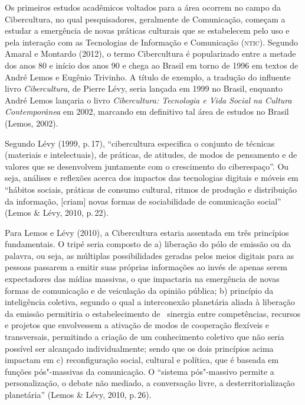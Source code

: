 Os primeiros estudos acadêmicos voltados para a área ocorrem no campo da
Cibercultura, no qual pesquisadores, geralmente de Comunicação,
começam a estudar a emergência de novas práticas culturais que se
estabelecem pelo uso e pela interação com as Tecnologias de Informação e
Comunicação (\textsc{ntic}). Segundo Amaral e Montardo (2012), o termo
Cibercultura é popularizado entre a metade dos anos 80 e início dos anos
90 e chega ao Brasil em torno de 1996 em textos de André Lemos e Eugênio
Trivinho. A título de exemplo, a tradução do influente livro
\emph{Cibercultura}, de Pierre Lévy, seria lançada em 1999 no Brasil,
enquanto André Lemos lançaria o livro \emph{Cibercultura: Tecnologia e
Vida Social na Cultura Contemporânea} em 2002, marcando em definitivo
tal área de estudos no Brasil (Lemos, 2002).

Segundo Lévy (1999, p.\,17), ``cibercultura especifica o conjunto de
técnicas (materiais e intelectuais), de práticas, de atitudes, de modos
de pensamento e de valores que se desenvolvem juntamente com o
crescimento do ciberespaço''. Ou seja, análises e reflexões acerca dos
impactos das tecnologias digitais e móveis em ``hábitos sociais,
práticas de consumo cultural, ritmos de produção e distribuição da
informação, {[}criam{]} novas formas de sociabilidade de comunicação
social'' (Lemos \& Lévy, 2010, p.\,22).

Para Lemos e Lévy (2010), a Cibercultura estaria assentada em três
princípios fundamentais. O tripé seria composto de a) liberação do pólo
de emissão ou da palavra, ou seja, as múltiplas possibilidades geradas
pelos meios digitais para as pessoas passarem a emitir suas próprias
informações ao invés de apenas serem expectadores das mídias massivas, o
que impactaria na emergência de novas formas de comunicação e de
veiculação da opinião pública; b) princípio da inteligência coletiva,
segundo o qual a interconexão planetária aliada à liberação da emissão
permitiria o estabelecimento de ~sinergia entre competências, recursos e
projetos que envolvessem a ativação de modos de cooperação flexíveis e
transversais, permitindo a criação de um conhecimento coletivo que não
seria possível ser alcançado individualmente; sendo que os dois
princípios acima impactam em c) reconfiguração social, cultural e
política, que é baseada em funções pós"-massivas da comunicação. O
``sistema pós"-massivo permite a personalização, o debate não mediado, a
conversação livre, a desterritorialização planetária'' (Lemos \& Lévy,
2010, p.\,26).

